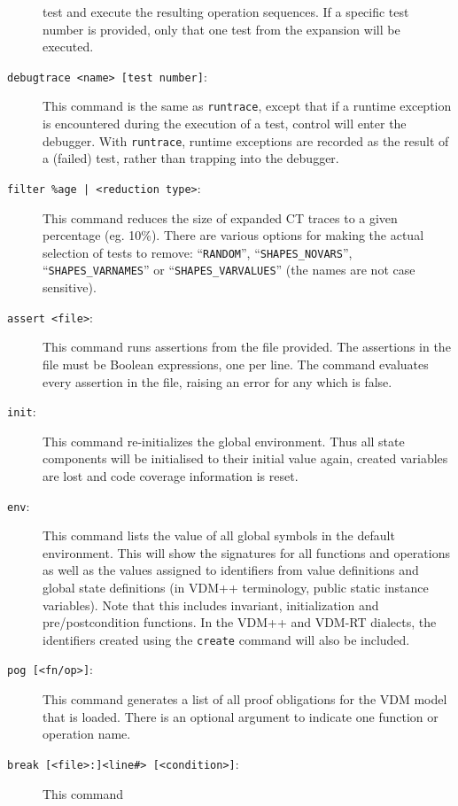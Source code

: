 \documentclass{overturerepchap}
\begin{document}
\begin{description}
  test and execute the resulting
  operation sequences. If a specific test number is provided, only
  that one test from the expansion will be executed. 
\item[\texttt{debugtrace <name> [test number]}:] This command is the same as
  \texttt{runtrace}, except that if a runtime exception is encountered during
  the execution of a test, control will enter the debugger. With \texttt{runtrace},
  runtime exceptions are recorded as the result of a (failed) test, rather than
  trapping into the debugger.
\item[\texttt{filter \%age | <reduction type>}:] This command reduces
  the size of expanded CT traces to a given percentage (eg. 10\%).
  There are various options for making the actual selection of tests to remove:
  ``\texttt{RANDOM}'', ``\texttt{SHAPES\_NOVARS}'', ``\texttt{SHAPES\_VARNAMES}''
   or ``\texttt{SHAPES\_VARVALUES}'' (the names are not case sensitive).
\item[\texttt{assert <file>}:] This command runs assertions from the
  file provided. The assertions in the file must be Boolean
  expressions, one per line. The command evaluates every assertion in
  the file, raising an error for any which is false.
\item[\texttt{init}:] This command re-initializes the global
  environment. Thus all state components will be initialised to their
  initial value again, created variables are lost and code coverage information
  is reset.
\item[\texttt{env}:] This command lists the value of all global symbols
  in the default environment. This will show the signatures for all
  functions and operations as well as the values assigned to
  identifiers from value definitions and global state definitions (in VDM++
  terminology, public static instance variables). Note that this includes invariant,
  initialization and pre/postcondition functions. In the VDM++ and
  VDM-RT dialects, the identifiers created using the \texttt{create}
  command will also be included.
\item[\texttt{pog [<fn/op>]}:] This command generates a list of all proof
  obligations for the VDM model that is loaded. There is an optional argument
  to indicate one function or operation name.
\item[\texttt{break [<file>:]<line\#> [<condition>]}:] This command

\end{description}
\end{document}
